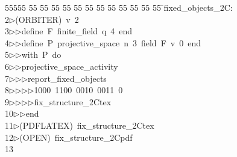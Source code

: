 %
%
\begin{tabbing}
55555 \= 55 \= 55 \= 55 \= 55 \= 55 \= 55 \= 55 \= 55 \= 55 \= 55 \= 55 \= 55 \= \>fixed\_objects\_2C:\\[0pt]
2\>$\triangleright$\>(ORBITER)\ v\ 2\ \\[0pt]
3\>$\triangleright$\>$\triangleright$\>define\ F\ finite\_field\ q\ 4\ end\ \\[0pt]
4\>$\triangleright$\>$\triangleright$\>define\ P\ projective\_space\ n\ 3\ field\ F\ v\ 0\ end\ \\[0pt]
5\>$\triangleright$\>$\triangleright$\>with\ P\ do\ \\[0pt]
6\>$\triangleright$\>$\triangleright$\>projective\_space\_activity\ \\[0pt]
7\>$\triangleright$\>$\triangleright$\>$\triangleright$\>report\_fixed\_objects\ \\[0pt]
8\>$\triangleright$\>$\triangleright$\>$\triangleright$\>$\triangleright$\>1000\ 1100\ 0010\ 0011\ 0\ \\[0pt]
9\>$\triangleright$\>$\triangleright$\>$\triangleright$\>$\triangleright$\>fix\_structure\_2Ctex\ \\[0pt]
10\>$\triangleright$\>$\triangleright$\>end\ \\[0pt]
11\>$\triangleright$\>(PDFLATEX)\ fix\_structure\_2Ctex\\[0pt]
12\>$\triangleright$\>(OPEN)\ fix\_structure\_2Cpdf\\[0pt]
13\>\end{tabbing}

